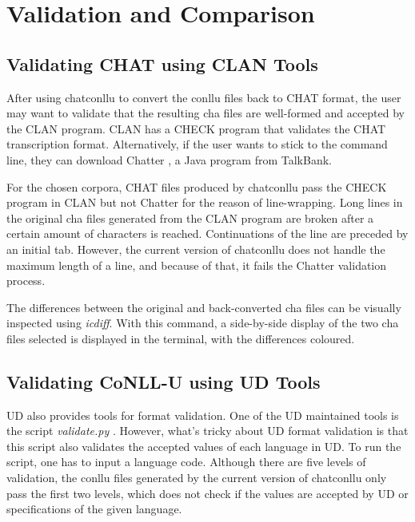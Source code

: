 \chapter{Validation and Comparison} %

\label{Chapter5} %

\section{Validating CHAT using CLAN Tools}

After using chatconllu to convert the conllu files back to CHAT format, the user may want to validate that the resulting cha files are well-formed and accepted by the CLAN program. CLAN has a CHECK program  that validates the CHAT transcription format. Alternatively, if the user wants to stick to the command line, they can download Chatter , a Java program from TalkBank.


For the chosen corpora, CHAT files produced by chatconllu pass the CHECK program in CLAN but not Chatter for the reason of line-wrapping. Long lines in the original cha files generated from the CLAN program are broken after a certain amount of characters is reached. Continuations of the line are preceded by an initial tab. However, the current version of chatconllu does not handle the maximum length of a line, and because of that, it fails the Chatter validation process.

The differences between the original and back-converted cha files can be visually inspected using \emph{icdiff}. With this command, a side-by-side display of the two cha files selected is displayed in the terminal, with the differences coloured.

\section{Validating CoNLL-U using UD Tools}

UD also provides tools for format validation. One of the UD maintained tools is the script \emph{validate.py} . However, what's tricky about UD format validation is that this script also validates the accepted values of each language in UD. To run the script, one has to input a language code. Although there are five levels of validation, the conllu files generated by the current version of chatconllu only pass the first two levels, which does not check if the values are accepted by UD or specifications of the given language.
